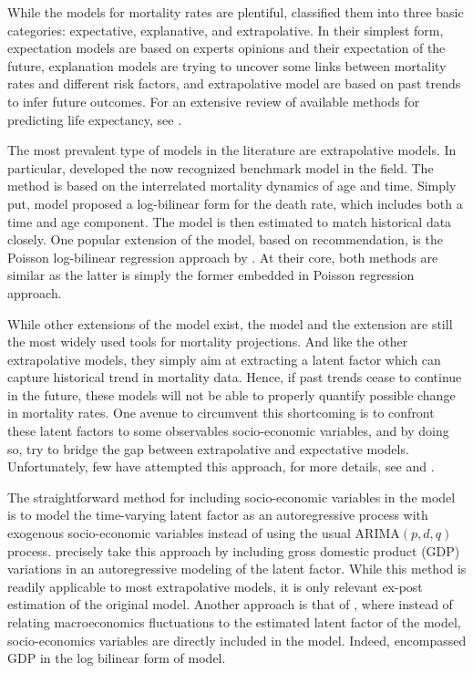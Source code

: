 \documentclass[AER, draftmode]{AEA}
\begin{document}
While the models for mortality rates are plentiful, \citet{Booth2008} classified them into three basic categories: expectative, explanative, and extrapolative. In their simplest form, expectation models are based on experts opinions and their expectation of the future, explanation models are trying to uncover some links between mortality rates and different risk factors, and extrapolative model are based on past trends to infer future outcomes. For an extensive review of available methods for predicting life expectancy, see \citet{Booth2008}.

The most prevalent type of models in the literature are extrapolative models. In particular, \cite{Lee1992} developed the now recognized benchmark model in the field. The method is based on the interrelated mortality dynamics of age and time. Simply put, \cite{Lee1992} model proposed a log-bilinear form for the death rate, which includes both a time and age component. The model is then estimated to match historical data closely. One popular extension of the \cite{Lee1992} model, based on \cite{Alho2000} recommendation, is the Poisson log-bilinear regression approach by \citet{Brouhns2002}. At their core, both methods are similar as the latter is simply the former embedded in Poisson regression approach. 

While other extensions of the \cite{Lee1992} model exist, the \cite{Lee1992} model and the \citet{Brouhns2002} extension are still the most widely used tools for mortality projections. And like the other extrapolative models, they simply aim at extracting a latent factor which can capture historical trend in mortality data. Hence, if past trends cease to continue in the future, these models will not be able to properly quantify possible change in mortality rates. One avenue to circumvent this shortcoming is to confront these latent factors to some observables socio-economic variables, and by doing so, try to bridge the gap between extrapolative and expectative models. Unfortunately, few have attempted this approach, for more details, see \cite{Hanewald2009} and \cite{Niu2014}.

The straightforward method for including socio-economic variables in the \cite{Lee1992} model is to model the time-varying latent factor as an autoregressive process with exogenous socio-economic variables instead of using the usual ARIMA$(p,d,q)$ process. \cite{Hanewald2009} precisely take this approach by including gross domestic product (GDP) variations in an autoregressive modeling of the latent factor. While this method is readily applicable to most extrapolative models, it is only relevant ex-post estimation of the original model. Another approach is that of \cite{Niu2014}, where instead of relating macroeconomics fluctuations to the estimated latent factor of the \cite{Lee1992} model, socio-economics variables are directly included in the \cite{Lee1992} model. Indeed, \cite{Niu2014} encompassed GDP in the log bilinear form of \cite{Lee1992} model.
\end{document}
